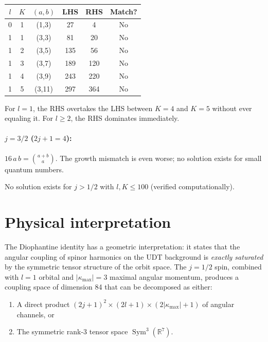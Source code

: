\documentclass[11pt,letterpaper]{article}
\numberwithin{equation}{section}
\begin{document}
\begin{center}
\begin{tabular}{ccc|cc|c}
\toprule
$l$ & $K$ & $(a,b)$ & LHS & RHS & Match? \\
\midrule
0 & 1 & (1,3) & 27 & 4 & No \\
1 & 1 & (3,3) & 81 & 20 & No \\
1 & 2 & (3,5) & 135 & 56 & No \\
1 & 3 & (3,7) & 189 & 120 & No \\
1 & 4 & (3,9) & 243 & 220 & No \\
1 & 5 & (3,11) & 297 & 364 & No \\
\bottomrule
\end{tabular}
\end{center}

For $l = 1$, the RHS overtakes the LHS between $K = 4$ and $K = 5$ without
ever equaling it. For $l \geq 2$, the RHS dominates immediately.

\paragraph{$j = 3/2$ ($2j+1 = 4$):}
$16\,a\,b = \binom{a+b}{a}$. The growth mismatch is even worse; no solution
exists for small quantum numbers.

No solution exists for $j > 1/2$ with $l, K \leq 100$ (verified computationally).

\section{Physical interpretation}
\label{sec:interpretation}

The Diophantine identity has a geometric interpretation: it states that the
angular coupling of spinor harmonics on the UDT background is
\emph{exactly saturated} by the symmetric tensor structure of the orbit
space. The $j = 1/2$ spin, combined with $l = 1$ orbital and
$|\kappa_\mathrm{max}| = 3$ maximal angular momentum, produces a coupling
space of dimension 84 that can be decomposed as either:
\begin{enumerate}
  \item A direct product $(2j+1)^2 \times (2l+1) \times (2|\kappa_\mathrm{max}|+1)$
    of angular channels, or
  \item The symmetric rank-3 tensor space $\operatorname{Sym}^3(\mathbb{R}^7)$.
\end{enumerate}
\end{document}
